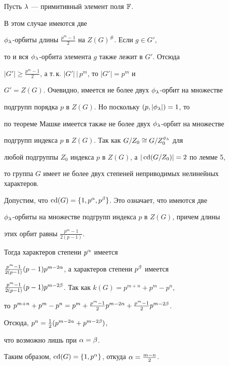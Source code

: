 \begin{pf}


Пусть $\lambda$ --- примитивный элемент поля $\Bbb F$.


В этом случае имеются две \linebreak


$\phi_\lambda$-орбиты длины $\frac{p^m-1}{2}$ на $Z(G)^{\#}$. Если $g\in G'$,


то и вся $\phi_\lambda$-орбита элемента $g$ также лежит в $G'$. Отсюда


$|G'|\ge\frac{p^m-1}{2}$, а т.\,к. $|G'|\,\big|\,p^m$, то $|G'|=p^m$ и


$G'=Z(G)$. Очевидно, имеется не более двух $\phi_\lambda$-орбит на множестве


подгрупп порядка $p$ в $Z(G)$. Но поскольку $(p,|\phi_\lambda|)=1$, то


по теореме Машке имеется также не более двух $\phi_\lambda$-орбит на множестве 


подгрупп индекса $p$ в $Z(G)$. Так как $G/Z_0\cong G/Z_0^{\phi_\lambda}$ для 


любой подгруппы $Z_0$ индекса $p$ в $Z(G)$, а $|\operatorname{cd}(G/Z_0)|=2$ по лемме 5, 


то группа $G$ имеет не более двух степеней неприводимых нелинейных характеров.





Допустим, что $\operatorname{cd}(G)=\lbrace1,p^\alpha,p^\beta\rbrace$. Это означает, что имеются две


$\phi_\lambda$-орбиты на множестве подгрупп индекса $p$ в $Z(G)$, причем длины 


этих орбит равны $\frac{p^m-1}{2(p-1)}$.


Тогда характеров степени $p^\alpha$ имеется


$\frac{p^m-1}{2(p-1)}(p-1)p^{m-2\alpha}$, а характеров степени $p^\beta$ имеется


$\frac{p^m-1}{2(p-1)}(p-1)p^{m-2\beta}$. Так как $k(G)=p^{m+n}+p^m-p^n$,


то $p^{m+n}+p^m-p^n=p^m+\frac{p^m-1}{2}p^{m-2\alpha}+\frac{p^m-1}{2}p^{m-2\beta}$.


Отсюда, $p^n=\frac12(p^{m-2\alpha}+p^{m-2\beta})$, 


что возможно лишь при $\alpha=\beta$.


Таким образом, $\operatorname{cd}(G)=\lbrace1,p^\alpha\rbrace$, откуда $\alpha=\frac{m-n}{2}$.


\end{pf}





